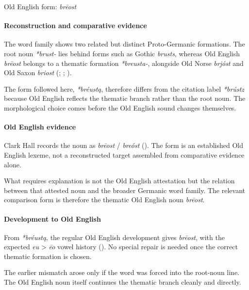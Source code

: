 \documentclass[
  british,
  a4paper,
]{article}
\begin{document}
Old English form: \emph{brēost}

\paragraph{Reconstruction and comparative
evidence}\label{reconstruction-and-comparative-evidence-6}

The word family shows two related but distinct Proto-Germanic
formations. The root noun \emph{*brust-} lies behind forms such as
Gothic \emph{brusts}, whereas Old English \emph{brēost} belongs to a
thematic formation \emph{*breusta-}, alongside Old Norse \emph{brjóst}
and Old Saxon \emph{briost} (; ;
).

The form followed here, \emph{*bréustą}, therefore differs from the
citation label \emph{*brústz} because Old English reflects the thematic
branch rather than the root noun. The morphological choice comes before
the Old English sound changes themselves.

\paragraph{Old English evidence}\label{old-english-evidence-6}

Clark Hall records the noun as \emph{brēost} / \emph{breóst}
(). The form is an
established Old English lexeme, not a reconstructed target assembled
from comparative evidence alone.

What requires explanation is not the Old English attestation but the
relation between that attested noun and the broader Germanic word
family. The relevant comparison form is therefore the thematic Old
English noun \emph{brēost}.

\paragraph{Development to Old
English}\label{development-to-old-english-6}

From \emph{*bréustą}, the regular Old English development gives
\emph{brēost}, with the expected \emph{eu} \textgreater{} \emph{ēo}
vowel history ().
No special repair is needed once the correct thematic formation is
chosen.

The earlier mismatch arose only if the word was forced into the
root-noun line. The Old English noun itself continues the thematic
branch cleanly and directly.
\end{document}
